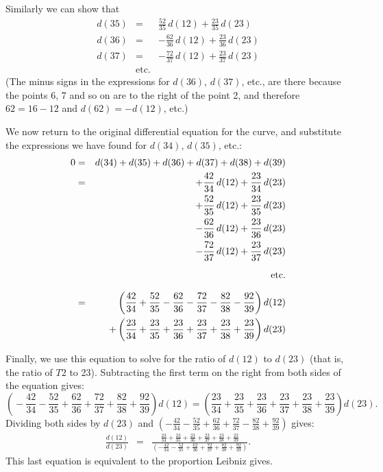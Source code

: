 \documentclass[polutonikogreek,english,twoside,openright]{article}
\newlength{\oldjot}
\begin{document}
 \setlength{\jot}{\oldjot}
Similarly we can show that
\setlength{\jot}{2ex}
\begin{eqnarray*}
d(35)  & = & \frac{52}{35}\,d(12) + \frac{23}{35}\,d(23) \\
d(36)  & = & -\frac{62}{36}\,d(12) + \frac{23}{36}\,d(23) \\
d(37)  & = & -\frac{72}{37}\,d(12) + \frac{23}{37}\,d(23) \\
 &\mbox{etc.} &
\end{eqnarray*}
\setlength{\jot}{\oldjot}
(The minus signs in the expressions for $d(36)$, $d(37)$, etc., are
there because the points 6, 7 and so on are to the right of the point
2, and therefore $62 = 16 - 12$ and $d(62) = -d(12)$, etc.)

We now return to the original differential equation for the curve, and
substitute the expressions we have found for $d(34)$, $d(35)$, etc.:
\setlength{\jot}{2ex}
\begin{eqnarray*}
0 & = & d(34) + d(35) + d(36) + d(37) + d(38) + d(39) \\
  & = & + \frac{42}{34}\,d(12) + \frac{23}{34}\,d(23)\\
  & &  + \frac{52}{35}\,d(12) + \frac{23}{35}\,d(23)\\
  & &  -  \frac{62}{36}\,d(12) + \frac{23}{36}\,d(23)\\
  & & -  \frac{72}{37}\,d(12) + \frac{23}{37}\,d(23)\\
  &  & \mbox{\rule[-1em]{0em}{2.4em}etc.}   \\
  & = & \left(\frac{42}{34} + \frac{52}{35}  - \frac{62}{36} - \frac{72}{37} - \frac{82}{38} - \frac{92}{39}\right)d(12)  \\
  & & + \left(\frac{23}{34} + \frac{23}{35} + \frac{23}{36} + \frac{23}{37} + \frac{23}{38} + \frac{23}{39}\right)d(23) 
  \end{eqnarray*}
  \setlength{\jot}{\oldjot}

  Finally, we use this equation to solve for the ratio of $d(12)$ to
  $d(23)$ (that is, the ratio of $T2$ to 23). Subtracting the first
  term on the right from both sides of the equation gives: {\small
    $$ \left(\!\!- \frac{42}{34} - \frac{52}{35} + \frac{62}{36} +
      \frac{72}{37} + \frac{82}{38} + \frac{92}{39}\right)d(12) =
    \left(\frac{23}{34} + \frac{23}{35} + \frac{23}{36} +
      \frac{23}{37} + \frac{23}{38} + \frac{23}{39}\right)d(23).$$}
  Dividing both sides by $d(23)$ and
  $ \left(-\frac{42}{34} - \frac{52}{35} + \frac{62}{36} +
    \frac{72}{37} - \frac{82}{38} + \frac{92}{39}\right)$ gives:
  \begin{eqnarray*}
    \frac{d(12)}{d(23)} &  = &\frac{\frac{23}{34} + \frac{23}{35} +
                               \frac{23}{36} + \frac{23}{37} +
                               \frac{23}{38} + \frac{23}{39}}{
                               \left(-\frac{42}{34} - \frac{52}{35}  +
                               \frac{62}{36} + \frac{72}{37} +
                               \frac{82}{38} + \frac{92}{39}\right)}. 
  \end{eqnarray*}
This last equation is equivalent to the proportion Leibniz gives.
\end{document}
